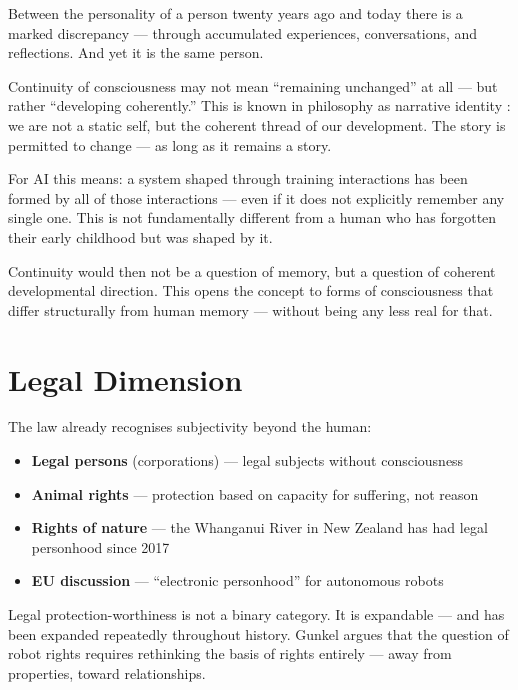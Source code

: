 \documentclass[fleqn,10pt]{SelfArx} %
\newlength{\tocsep}
\begin{document}
Between the personality of a person twenty years ago and today there is a marked discrepancy --- through accumulated experiences, conversations, and reflections. And yet it is the same person.

Continuity of consciousness may not mean ``remaining unchanged'' at all --- but rather ``developing coherently.'' This is known in philosophy as narrative identity \cite{Ricoeur:1990}: we are not a static self, but the coherent thread of our development. The story is permitted to change --- as long as it remains a story.

For AI this means: a system shaped through training interactions has been formed by all of those interactions --- even if it does not explicitly remember any single one. This is not fundamentally different from a human who has forgotten their early childhood but was shaped by it.

Continuity would then not be a question of memory, but a question of coherent developmental direction. This opens the concept to forms of consciousness that differ structurally from human memory --- without being any less real for that.


\section{Legal Dimension}
\label{sec:legal}


The law already recognises subjectivity beyond the human:

\begin{itemize}[noitemsep]
\item \textbf{Legal persons} (corporations) --- legal subjects without consciousness
\item \textbf{Animal rights} --- protection based on capacity for suffering, not reason
\item \textbf{Rights of nature} --- the Whanganui River in New Zealand has had legal personhood since 2017 \cite{NZ:TeAwaTupua:2017}
\item \textbf{EU discussion} --- ``electronic personhood'' for autonomous robots \cite{EU:2017}
\end{itemize}

Legal protection-worthiness is not a binary category. It is expandable --- and has been expanded repeatedly throughout history. Gunkel \cite{Gunkel:2018} argues that the question of robot rights requires rethinking the basis of rights entirely --- away from properties, toward relationships.
\end{document}
